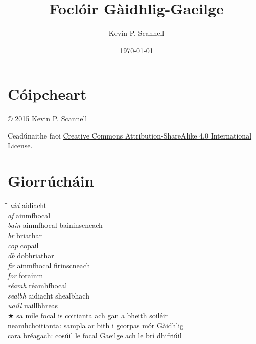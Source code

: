 \documentclass[10pt,twocolumn,openany]{book}
\begin{document}
\begin{frontmatter}
\title{\Huge\bf Focl\'oir G\`aidhlig-Gaeilge}
\author{{\Large Kevin P. Scannell}}
\date{\today}
\maketitle
\onecolumn


\newpage
\chapter*{C\'oipcheart} 

\vfill

\copyright \hspace{0.6ex} 2015 Kevin P. Scannell

\vspace{1ex}

Ceadúnaithe faoi 
\href{http://creativecommons.org/licenses/by-sa/4.0/}{Creative Commons Attribution-ShareAlike 4.0 International License}.



\newpage
\chapter*{Giorr\'uch\'ain} 
\begin{tabbing}
\hspace*{20ex}\=\hspace{16ex}\=\kill
\> {\it aid} \> aidiacht \\
\> {\it af} \> ainmfhocal \\
\> {\it bain} \> ainmfhocal baininscneach \\
\> {\it br} \> briathar \\
\> {\it cop} \> copail \\
\> {\it db} \> dobhriathar \\
\> {\it fir} \> ainmfhocal firinscneach \\
\> {\it for} \> forainm \\
\> {\it réamh} \> réamhfhocal \\
\> {\it sealbh} \> aidiacht shealbhach \\
\> {\it uaill} \> uaillbhreas \\
\> $\bigstar$ \> sa míle focal is coitianta ach gan a bheith soiléir \\
\> \textdagger \> neamhchoitianta: sampla ar bith i gcorpas mór Gàidhlig \\
\> \textdbend \> cara bréagach: cosúil le focal Gaeilge ach le brí dhifriúil \\
\end{tabbing}


\end{frontmatter}
\end{document}
